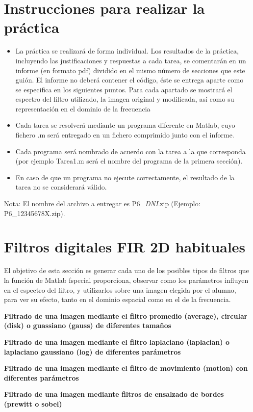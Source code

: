 \documentclass[10pt,twoside,spanish,a4paper]{article}
\begin{document}
\section*{Instrucciones para realizar la práctica}
\begin{itemize}
	\item La práctica se realizará de forma individual. Los resultados de la práctica, incluyendo las justificaciones y respuestas a cada tarea, se comentarán en un informe (en formato pdf) dividido en el mismo número de secciones que este guión.
	El informe no deberá contener el código, éste se entrega aparte como se especifica en los siguientes puntos. Para cada apartado se mostrará el espectro del filtro utilizado, la imagen original y modificada, as\'{i} como su representaci\'{o}n en el dominio de la frecuencia
	\item Cada tarea se resolverá mediante un programa diferente en Matlab, cuyo fichero .m será entregado en un fichero comprimido junto con el informe.
	\item Cada programa será nombrado de acuerdo con la tarea a la que corresponda (por ejemplo Tarea1.m será el nombre del programa de la primera sección).
   	\item En caso de que un programa no ejecute correctamente, el resultado de la tarea no se considerará válido.
\end{itemize}
\vspace{-1em}
\color{blue}Nota: \color{black} El nombre del archivo a entregar es P6\_\emph{DNI}.zip (Ejemplo: \color{blue}P6\_12345678X.zip\color{black}).


\section*{Filtros digitales FIR 2D habituales}

El objetivo de esta secci\'{o}n es generar cada uno de los posibles tipos de filtros que la
funci\'{o}n de Matlab \color{blue}fspecial \color{black} proporciona, observar como los par\'{a}metros influyen en el espectro
del filtro, y utilizarlos sobre una imagen elegida por el alumno, para ver su efecto,
tanto en el dominio espacial como en el de la frecuencia.

\begin{itemize}
\itemP  \textbf{Filtrado de una imagen mediante el filtro promedio (average), circular (disk) o guassiano (gauss) de diferentes tama\~{n}os}


\itemP  \textbf{Filtrado de una imagen mediante el filtro laplaciano (laplacian) o laplaciano gaussiano (log) de diferentes par\'{a}metros}



\itemP  \textbf{Filtrado de una imagen mediante el filtro de movimiento (motion) con diferentes par\'{a}metros}

\itemP  \textbf{Filtrado de una imagen mediante filtros de ensalzado de bordes (prewitt o sobel)}

\end{itemize}
\end{document}
